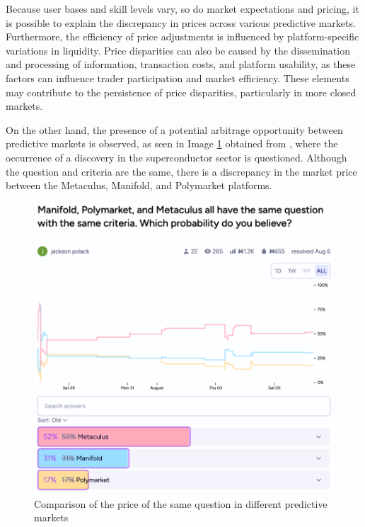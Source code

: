 Because user bases and skill levels vary, so do market expectations and pricing, it is possible to explain the discrepancy in prices across various predictive markets. Furthermore, the efficiency of price adjustments is influenced by platform-specific variations in liquidity. Price disparities can also be caused by the dissemination and processing of information, transaction costs, and platform usability, as these factors can influence trader participation and market efficiency. These elements may contribute to the persistence of price disparities, particularly in more closed markets.

On the other hand, the presence of a potential arbitrage opportunity between predictive markets is observed, as seen in Image \ref{fig:market_comparison} obtained from \cite{Polack}, where the occurrence of a discovery in the superconductor sector is questioned. Although the question and criteria are the same, there is a discrepancy in the market price between the Metaculus, Manifold, and Polymarket platforms.

\begin{figure}[H]
    \centering
    \includegraphics[scale=0.6]{img/MarketComparison.png}
    \caption{Comparison of the price of the same question in different predictive markets}
    \label{fig:market_comparison}
\end{figure}

